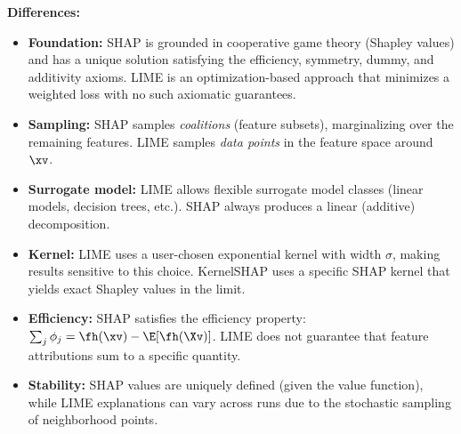{\begin{enumerate}
    \textbf{Differences:}
    \begin{itemize}
        \item \textbf{Foundation:} SHAP is grounded in cooperative game theory (Shapley values) and has a unique solution satisfying the efficiency, symmetry, dummy, and additivity axioms. LIME is an optimization-based approach that minimizes a weighted loss with no such axiomatic guarantees.
        \item \textbf{Sampling:} SHAP samples \emph{coalitions} (feature subsets), marginalizing over the remaining features. LIME samples \emph{data points} in the feature space around $\xv$.
        \item \textbf{Surrogate model:} LIME allows flexible surrogate model classes (linear models, decision trees, etc.). SHAP always produces a linear (additive) decomposition.
        \item \textbf{Kernel:} LIME uses a user-chosen exponential kernel with width $\sigma$, making results sensitive to this choice. KernelSHAP uses a specific SHAP kernel that yields exact Shapley values in the limit.
        \item \textbf{Efficiency:} SHAP satisfies the efficiency property: $\sum_j \phi_j = \fh(\xv) - \E[\fh(\Xv)]$. LIME does not guarantee that feature attributions sum to a specific quantity.
        \item \textbf{Stability:} SHAP values are uniquely defined (given the value function), while LIME explanations can vary across runs due to the stochastic sampling of neighborhood points.
    \end{itemize}
\end{enumerate}
}
